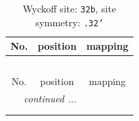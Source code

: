 \documentclass[fleqn,8pt]{jsarticle}
\begin{document}
\renewcommand{\arraystretch}{1.2}
\begin{longtable}{ccc}
\caption{Wyckoff site: {\tt 32b}, site symmetry: {\tt .32'}}
 \\
 \hline \hline
No. & position & mapping \\ \hline \endfirsthead

\multicolumn{2}{l}{\tablename\ \thetable{}} \\
 \hline \hline
No. & position & mapping \\ \hline \endhead

 \hline \hline
\multicolumn{2}{r}{\footnotesize\it continued ...} \\ \endfoot

 \hline \hline
\multicolumn{2}{r}{} \\ \endlastfoot


\end{longtable}
\end{document}
